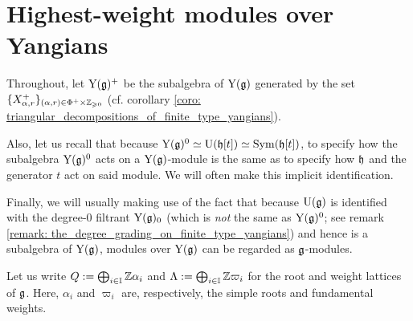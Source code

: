 \section{Highest-weight modules over Yangians} \label{section: highest_weight_modules_for_finite_yangians}
    \begin{convention}
        Throughout, let $\mathrm{Y}(\mathfrak{g})^+$ be the  subalgebra of $\mathrm{Y}(\mathfrak{g})$ generated by the set $\{ X^+_{\alpha, r} \}_{(\alpha, r) \in \Phi^+ \x \Z_{\geq 0}}$ (cf. corollary \ref{coro: triangular_decompositions_of_finite_type_yangians}).

        Also, let us recall that because $\mathrm{Y}(\mathfrak{g})^0 \simeq \mathrm{U}(\mathfrak{h}[t]) \simeq \mathrm{Sym}(\mathfrak{h}[t])$, to specify how the subalgebra $\mathrm{Y}(\mathfrak{g})^0$ acts on a $\mathrm{Y}(\mathfrak{g})$-module is the same as to specify how $\mathfrak{h}$ and the generator $t$ act on said module. We will often make this implicit identification.

        Finally, we will usually making use of the fact that because $\mathrm{U}(\mathfrak{g})$ is identified with the degree-$0$ filtrant $\mathrm{Y}(\mathfrak{g})_0$ (which is \textit{not} the same as $\mathrm{Y}(\mathfrak{g})^0$; see remark \ref{remark: the_degree_grading_on_finite_type_yangians}) and hence is a subalgebra of $\mathrm{Y}(\mathfrak{g})$, modules over $\mathrm{Y}(\mathfrak{g})$ can be regarded as $\mathfrak{g}$-modules.
    \end{convention}

    \begin{convention}
        Let us write $Q := \bigoplus_{i \in \mathbb{I}} \mathbb{Z} \alpha_i$ and $\Lambda := \bigoplus_{i \in \mathbb{I}} \mathbb{Z} \varpi_i$ for the root and weight lattices of $\mathfrak{g}$. Here, $\alpha_i$ and $\varpi_i$ are, respectively, the simple roots and fundamental weights.
    \end{convention}

